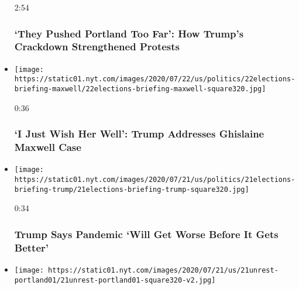 \begin{itemize}
  2:54

  \hypertarget{they-pushed-portland-too-far-how-trumps-crackdown-strengthened-protests}{%
  \subsubsection{`They Pushed Portland Too Far': How Trump's Crackdown
  Strengthened
  Protests}\label{they-pushed-portland-too-far-how-trumps-crackdown-strengthened-protests}}
\item
  \href{https://www.nytimes.com/video/us/politics/100000007251195/trump-ghislaine-maxwell.html?action=click\&module=video-series-bar\&region=header\&pgtype=Article\&playlistId=video/u-s}{}

  \texttt{[image: https://static01.nyt.com/images/2020/07/22/us/politics/22elections-briefing-maxwell/22elections-briefing-maxwell-square320.jpg]}

  0:36

  \hypertarget{i-just-wish-her-well-trump-addresses-ghislaine-maxwell-case}{%
  \subsubsection{`I Just Wish Her Well': Trump Addresses Ghislaine
  Maxwell
  Case}\label{i-just-wish-her-well-trump-addresses-ghislaine-maxwell-case}}
\item
  \href{https://www.nytimes.com/video/us/100000007250068/trump-says-virus-worse-before-better.html?action=click\&module=video-series-bar\&region=header\&pgtype=Article\&playlistId=video/u-s}{}

  \texttt{[image: https://static01.nyt.com/images/2020/07/21/us/politics/21elections-briefing-trump/21elections-briefing-trump-square320.jpg]}

  0:34

  \hypertarget{trump-says-pandemic-will-get-worse-before-it-gets-better}{%
  \subsubsection{Trump Says Pandemic `Will Get Worse Before It Gets
  Better'}\label{trump-says-pandemic-will-get-worse-before-it-gets-better}}
\item
  \href{https://www.nytimes.com/video/us/100000007248945/portland-protests-federal-agents.html?action=click\&module=video-series-bar\&region=header\&pgtype=Article\&playlistId=video/u-s}{}

  \texttt{[image: https://static01.nyt.com/images/2020/07/21/us/21unrest-portland01/21unrest-portland01-square320-v2.jpg]}


\end{itemize}
